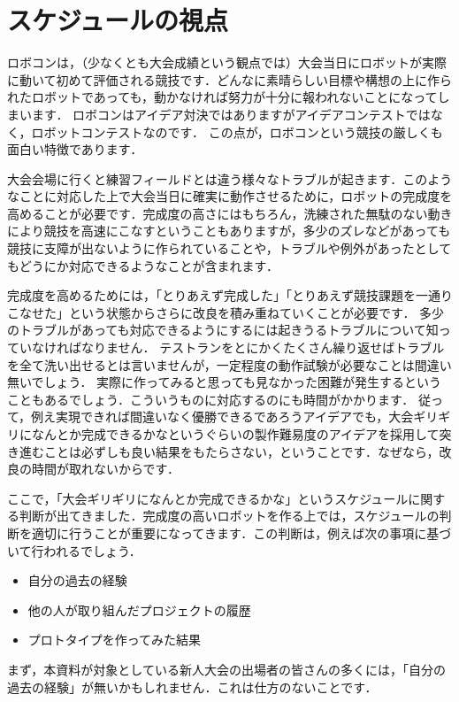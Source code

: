 \section{スケジュールの視点}

ロボコンは，（少なくとも大会成績という観点では）大会当日にロボットが実際に動いて初めて評価される競技です．どんなに素晴らしい目標や構想の上に作られたロボットであっても，動かなければ努力が十分に報われないことになってしまいます．
ロボコンはアイデア対決ではありますがアイデアコンテストではなく，ロボットコンテストなのです．
この点が，ロボコンという競技の厳しくも面白い特徴であります．

大会会場に行くと練習フィールドとは違う様々なトラブルが起きます．このようなことに対応した上で大会当日に確実に動作させるために，ロボットの完成度を高めることが必要です．完成度の高さにはもちろん，洗練された無駄のない動きにより競技を高速にこなすということもありますが，多少のズレなどがあっても競技に支障が出ないように作られていることや，トラブルや例外があったとしてもどうにか対応できるようなことが含まれます．

完成度を高めるためには，「とりあえず完成した」「とりあえず競技課題を一通りこなせた」という状態からさらに改良を積み重ねていくことが必要です．
多少のトラブルがあっても対応できるようにするには起きうるトラブルについて知っていなければなりません．
テストランをとにかくたくさん繰り返せばトラブルを全て洗い出せるとは言いませんが，一定程度の動作試験が必要なことは間違い無いでしょう．
実際に作ってみると思っても見なかった困難が発生するということもあるでしょう．こういうものに対応するのにも時間がかかります．
従って，例え実現できれば間違いなく優勝できるであろうアイデアでも，大会ギリギリになんとか完成できるかなというぐらいの製作難易度のアイデアを採用して突き進むことは必ずしも良い結果をもたらさない，ということです．なぜなら，改良の時間が取れないからです．

ここで，「大会ギリギリになんとか完成できるかな」というスケジュールに関する判断が出てきました．完成度の高いロボットを作る上では，スケジュールの判断を適切に行うことが重要になってきます．この判断は，例えば次の事項に基づいて行われるでしょう．

\begin{itemize}
    \item 自分の過去の経験
    \item 他の人が取り組んだプロジェクトの履歴
    \item プロトタイプを作ってみた結果
\end{itemize}

まず，本資料が対象としている新人大会の出場者の皆さんの多くには，「自分の過去の経験」が無いかもしれません．これは仕方のないことです．

